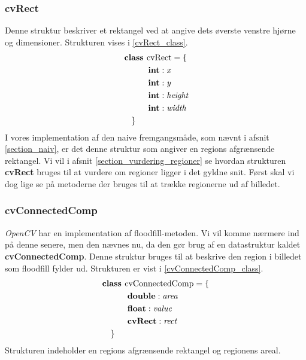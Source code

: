 {\subsubsection{cvRect}
Denne struktur beskriver et rektangel ved at angive dets øverste venstre
hjørne og dimensioner. Strukturen vises i \eqref{cvRect_class}.
\begin{multline}
    \textbf{class~} \textrm{cvRect} = \{ \\
    \shoveleft{\qquad\textbf{int} : \textit{x}} \\
    \shoveleft{\qquad\textbf{int} : \textit{y}} \\
    \shoveleft{\qquad\textbf{int} : \textit{height}} \\
    \shoveleft{\qquad\textbf{int} : \textit{width}} \\
    \shoveleft{\}}\shoveright{}
    \label{cvRect_class}
\end{multline}
I vores implementation af den naive fremgangsmåde, som nævnt i afsnit
\ref{section_naiv}, er det denne struktur som angiver en regions
afgrænsende rektangel. Vi vil i afsnit \ref{section_vurdering_regioner}
se hvordan strukturen \textbf{cvRect} bruges til at vurdere om regioner
ligger i det gyldne snit. Først skal vi dog lige se på metoderne der
bruges til at trække regionerne ud af billedet.

\subsubsection{cvConnectedComp}
\emph{OpenCV} har en implementation af floodfill-metoden. Vi vil komme
nærmere ind på denne senere, men den nævnes nu, da den gør brug af en
datastruktur kaldet \textbf{cvConnectedComp}. Denne struktur bruges til
at beskrive den region i billedet som floodfill fylder ud.  Strukturen
er vist i \eqref{cvConnectedComp_class}.
\begin{multline}
    \textbf{class~} \textrm{cvConnectedComp} = \{ \\
    \shoveleft{\qquad\textbf{double} : \textit{area}} \\
    \shoveleft{\qquad\textbf{float} : \textit{value}} \\
    \shoveleft{\qquad\textbf{cvRect} : \textit{rect}} \\
    \shoveleft{\}}\shoveright{}
    \label{cvConnectedComp_class}
\end{multline}
Strukturen indeholder en regions afgrænsende rektangel og regionens
areal.

}
